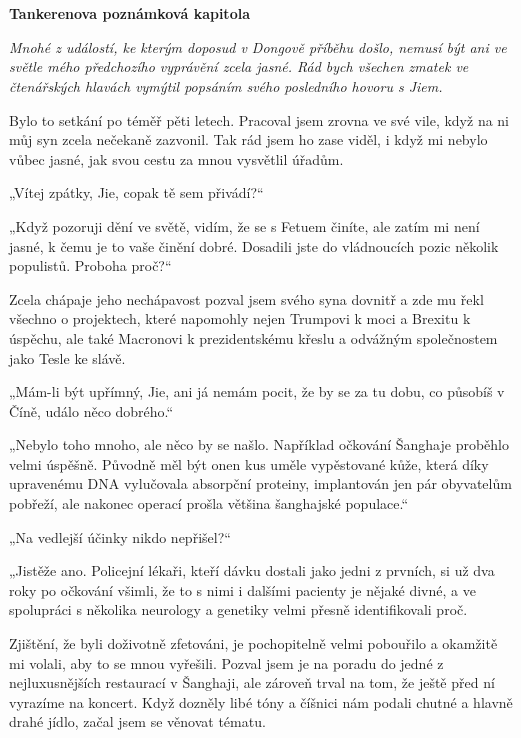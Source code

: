 \chapter{}
\textbf{Tankerenova poznámková kapitola}
\vspace{0.75cm}
{\itshape
Mnohé z událostí, ke kterým doposud v Dongově příběhu došlo, nemusí být ani ve světle mého předchozího vyprávění zcela jasné. Rád bych všechen zmatek ve čtenářských hlavách vymýtil popsáním svého posledního hovoru s Jiem.
\vspace{0.75cm}

Bylo to setkání po téměř pěti letech. Pracoval jsem zrovna ve své vile, když na ni můj syn zcela nečekaně zazvonil.  Tak rád jsem ho zase viděl, i když mi nebylo vůbec jasné, jak svou cestu za mnou vysvětlil úřadům.

„Vítej zpátky, Jie, copak tě sem přivádí?“

„Když pozoruji dění ve světě, vidím, že se s Fetuem činíte, ale zatím mi není jasné, k čemu je to vaše činění dobré. Dosadili jste do vládnoucích pozic několik populistů. Proboha proč?“

Zcela chápaje jeho nechápavost pozval jsem svého syna dovnitř a zde mu řekl všechno o projektech, které napomohly nejen Trumpovi k moci a Brexitu k úspěchu, ale také Macronovi k prezidentskému křeslu a odvážným společnostem jako Tesle ke slávě.

„Mám-li být upřímný, Jie, ani já nemám pocit, že by se za tu dobu, co působíš v Číně, událo něco dobrého.“

„Nebylo toho mnoho, ale něco by se našlo. Například očkování Šanghaje proběhlo velmi úspěšně. Původně měl být onen kus uměle vypěstované kůže, která díky upravenému DNA vylučovala absorpční proteiny, implantován jen pár obyvatelům pobřeží, ale nakonec operací prošla většina šanghajské populace.“

„Na vedlejší účinky nikdo nepřišel?“

„Jistěže ano. Policejní lékaři, kteří dávku dostali jako jedni z prvních, si už dva roky po očkování všimli, že to s nimi i dalšími pacienty je nějaké divné, a ve spolupráci s několika neurology a genetiky velmi přesně identifikovali proč. 

Zjištění, že byli doživotně zfetováni, je pochopitelně velmi pobouřilo a okamžitě mi volali, aby to se mnou vyřešili.
Pozval jsem je na poradu do jedné z nejluxusnějších restaurací v Šanghaji, ale zároveň trval na tom, že ještě před ní vyrazíme na koncert. Když dozněly libé tóny a číšnici nám podali chutné a hlavně drahé jídlo, začal jsem se věnovat tématu.

}
